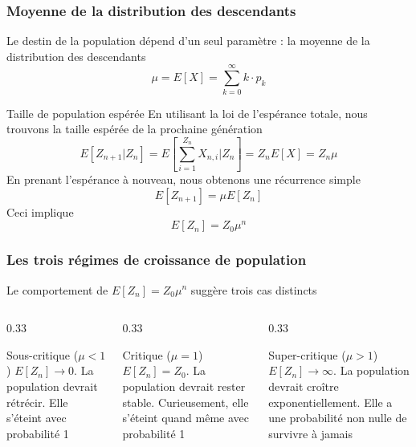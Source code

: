 \documentclass[aspectratio=169]{beamer}\usepackage[]{graphicx}\usepackage[]{xcolor}
\begin{document}
\begin{frame}
    \frametitle{Moyenne de la distribution des descendants}
    Le destin de la population dépend d'un seul paramètre : la moyenne de la distribution des descendants
    $$ \mu = E[X] = \sum_{k=0}^{\infty} k \cdot p_k $$
\end{frame}

\begin{frame}{Taille de population espérée}
        En utilisant la loi de l'espérance totale, nous trouvons la taille espérée de la prochaine génération
        $$ E[Z_{n+1} | Z_n] = E\left[\sum_{i=1}^{Z_n} X_{n,i} \bigg| Z_n\right] = Z_n E[X] = Z_n \mu $$
\vfill
        En prenant l'espérance à nouveau, nous obtenons une récurrence simple
        $$ E[Z_{n+1}] = \mu E[Z_n] $$
\vfill
        Ceci implique
        $$ E[Z_n] = Z_0 \mu^n $$
\end{frame}

\begin{frame}
    \frametitle{Les trois régimes de croissance de population}

    Le comportement de $E[Z_n] = Z_0 \mu^n$ suggère trois cas distincts

    \begin{columns}[T]
        \begin{column}{0.33\textwidth}
            \begin{block}{Sous-critique ($\mu < 1$)}
                $E[Z_n] \to 0$. La population devrait rétrécir. Elle s'éteint avec probabilité 1
            \end{block}
        \end{column}
        \begin{column}{0.33\textwidth}
            \begin{block}{Critique ($\mu = 1$)}
                $E[Z_n] = Z_0$. La population devrait rester stable. Curieusement, elle s'éteint quand même avec probabilité 1
            \end{block}
        \end{column}
        \begin{column}{0.33\textwidth}
            \begin{block}{Super-critique ($\mu > 1$)}
                $E[Z_n] \to \infty$. La population devrait croître exponentiellement. Elle a une probabilité non nulle de survivre à jamais
            \end{block}
        \end{column}
    \end{columns}
\end{frame}
\end{document}
